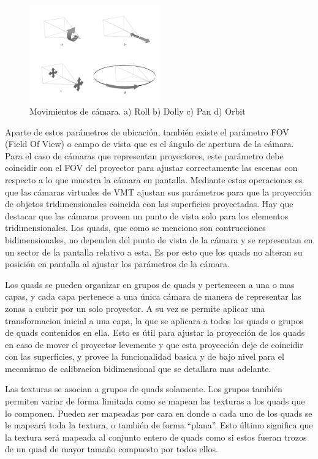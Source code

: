 \begin{figure}[H]
  \centering
    \includegraphics[width=0.5\textwidth]{./Cap5_vmt/vmtengine-cameramove.png}
  \caption{Movimientos de cámara. a) Roll b) Dolly c) Pan d) Orbit}
  \label{fig:VMT-CameraMove}
\end{figure}

Aparte de estos parámetros de ubicación, también existe el parámetro FOV (Field Of View) o campo de vista que es el ángulo de apertura de la cámara. Para el caso de cámaras que representan proyectores, este parámetro debe coincidir con el FOV del proyector para ajustar correctamente las escenas con respecto a lo que muestra la cámara en pantalla.
Mediante estas operaciones es que las cámaras virtuales de VMT ajustan sus parámetros para que la proyección de objetos tridimensionales coincida con las superficies proyectadas.
Hay que destacar que las cámaras proveen un punto de vista solo para los elementos tridimensionales. Los quads, que como se menciono son contrucciones bidimensionales, no dependen del punto de vista de la cámara y se representan en un sector de la pantalla relativo a esta. Es por esto que los quads no alteran su posición en pantalla al ajustar los parámetros de la cámara.

Los quads se pueden organizar en grupos de quads y pertenecen a una o mas capas, y cada capa pertenece a una única cámara de manera de representar las zonas a cubrir por un solo proyector. A su vez se permite aplicar una transformacion inicial a una capa, la que se aplicara a todos los quads o grupos de quads contenidos en ella. Esto es útil para ajustar la proyección de los quads en caso de mover el proyector levemente y que esta proyección deje de coincidir con las superficies, y provee la funcionalidad basica y de bajo nivel para el mecanismo de calibracion bidimensional que se detallara mas adelante.

Las texturas se asocian a grupos de quads solamente. Los grupos también permiten variar de forma limitada como se mapean las texturas a los quads que lo componen. Pueden ser mapeadas por cara en donde a cada uno de los quads se le mapeará toda la textura, o también de forma “plana”. Esto último significa que la textura será mapeada al conjunto entero de quads como si estos fueran trozos de un quad de mayor tamaño compuesto por todos ellos.

